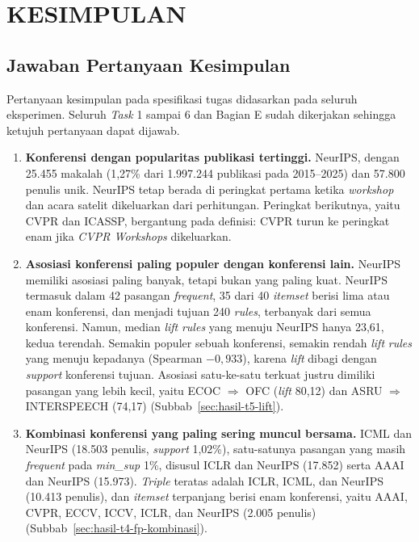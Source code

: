 \chapter{KESIMPULAN}
\label{chap:kesimpulan}

\section{Jawaban Pertanyaan Kesimpulan}
Pertanyaan kesimpulan pada spesifikasi tugas didasarkan pada seluruh eksperimen. Seluruh \textit{Task} 1 sampai 6 dan Bagian E sudah dikerjakan sehingga ketujuh pertanyaan dapat dijawab.

\begin{enumerate}
\item \textbf{Konferensi dengan popularitas publikasi tertinggi.} NeurIPS, dengan 25.455 makalah (1,27\% dari 1.997.244 publikasi pada 2015--2025) dan 57.800 penulis unik. NeurIPS tetap berada di peringkat pertama ketika \textit{workshop} dan acara satelit dikeluarkan dari perhitungan. Peringkat berikutnya, yaitu CVPR dan ICASSP, bergantung pada definisi: CVPR turun ke peringkat enam jika \textit{CVPR Workshops} dikeluarkan.
\item \textbf{Asosiasi konferensi paling populer dengan konferensi lain.} NeurIPS memiliki asosiasi paling banyak, tetapi bukan yang paling kuat. NeurIPS termasuk dalam 42 pasangan \textit{frequent}, 35 dari 40 \textit{itemset} berisi lima atau enam konferensi, dan menjadi tujuan 240 \textit{rules}, terbanyak dari semua konferensi. Namun, median \textit{lift} \textit{rules} yang menuju NeurIPS hanya 23,61, kedua terendah. Semakin populer sebuah konferensi, semakin rendah \textit{lift} \textit{rules} yang menuju kepadanya (Spearman $-0{,}933$), karena \textit{lift} dibagi dengan \textit{support} konferensi tujuan. Asosiasi satu-ke-satu terkuat justru dimiliki pasangan yang lebih kecil, yaitu ECOC $\Rightarrow$ OFC (\textit{lift} 80,12) dan ASRU $\Rightarrow$ INTERSPEECH (74,17) (Subbab~\ref{sec:hasil-t5-lift}).
\item \textbf{Kombinasi konferensi yang paling sering muncul bersama.} ICML dan NeurIPS (18.503 penulis, \textit{support} 1,02\%), satu-satunya pasangan yang masih \textit{frequent} pada \textit{min\_sup} 1\%, disusul ICLR dan NeurIPS (17.852) serta AAAI dan NeurIPS (15.973). \textit{Triple} teratas adalah ICLR, ICML, dan NeurIPS (10.413 penulis), dan \textit{itemset} terpanjang berisi enam konferensi, yaitu AAAI, CVPR, ECCV, ICCV, ICLR, dan NeurIPS (2.005 penulis) (Subbab~\ref{sec:hasil-t4-fp-kombinasi}).

\end{enumerate}
